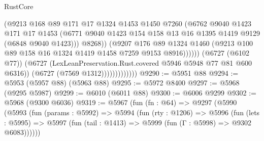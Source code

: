 \begin{lexlean}{RustCore}
\begin{coremodule}
                                    (@9213
                                      @168
                                      @89
                                      @171
                                      @17
                                      @1324
                                      @1453
                                      @1450
                                      @7260
                                      (@6762
                                        @9040
                                        @1423
                                        @171
                                        @17
                                        @1453
                                        (@6771
                                          @9040
                                          @1423
                                          @154
                                          @158
                                          @13
                                          @16
                                          @1395
                                          @1419
                                          @9129
                                          (@6848 @9040 @1423)))
                                      @8268))
                                  (@9207
                                    @176
                                    @89
                                    @1324
                                    @1460
                                    (@9213
                                      @100
                                      @89
                                      @158
                                      @16
                                      @1324
                                      @1419
                                      @1458
                                      @7259
                                      @9153
                                      @8916))))))
                          (@6727 (@6102 @77))
                          (@6727 (LexLeanPreservation.Rust.covered @5946 @5948 @77 @81 @600 @6316))
                          (@6727 (@7569 @1312)))))))))))))
@9290 := @5951 @88
@9294 := @5953 (@5957 @88) (@5963 @88)
@9295 := @5972 @8400
@9297 := @5968 (@9295 @5987)
@9299 := @6010 (@6011 @88)
@9300 := @6006 @9299
@9302 := @5968 (@9300 @6036)
@9319 := @5967
    (fun (fn : @64) =>
    @9297
      (@5990
        (@5993
          (fun (params : @5992) =>
          @5994
            (fun (rty : @1206) =>
            @5996
              (fun (lets : @5995) =>
              @5997 (fun (tail : @1413) => @5999 (fun (Γ : @5998) => @9302 @6083))))))

\end{coremodule}
\end{lexlean}
